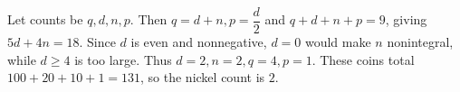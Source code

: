 Let counts be $q,d,n,p$. Then $q=d+n,p=\dfrac{d}{2}$ and $q+d+n+p=9$, giving $5d+4n=18$. Since $d$ is even and nonnegative, $d=0$ would make $n$ nonintegral, while $d\ge4$ is too large. Thus $d=2,n=2,q=4,p=1$. These coins total $100+20+10+1=131$, so the nickel count is $\boxed2$.
